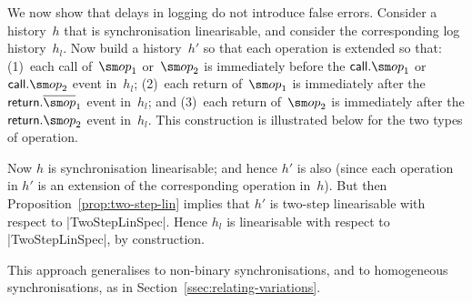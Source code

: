 We now show that delays in logging do not introduce false errors.  Consider a
history~$h$ that is synchronisation linearisable, and consider the
corresponding log history~$h_l$.  Now build a history~$h'$ so that each
operation is extended so that: (1)~each call of~$\op_1$ or~$\op_2$ is
immediately before the $\call.\op_1$ or $\call.\op_2$ event in~$h_l$; (2)~each
return of~$\op_1$ is immediately after the $\return.\overline\op_1$ event
in~$h_l$; and (3)~each return of~$\op_2$ is immediately after the
$\return.\op_2$ event in~$h_l$.  This construction is illustrated below for
the two types of operation.
%
\begin{center}
\end{center}
%
Now $h$ is synchronisation linearisable; and hence $h'$ is also (since each
operation in $h'$ is an extension of the corresponding operation in~$h$).  But
then Proposition~\ref{prop:two-step-lin} implies that $h'$ is two-step
linearisable with respect to |TwoStepLinSpec|.  Hence $h_l$ is linearisable
with respect to |TwoStepLinSpec|, by construction.

This approach generalises to non-binary synchronisations, and to homogeneous
synchronisations, as in Section~\ref{ssec:relating-variations}.



